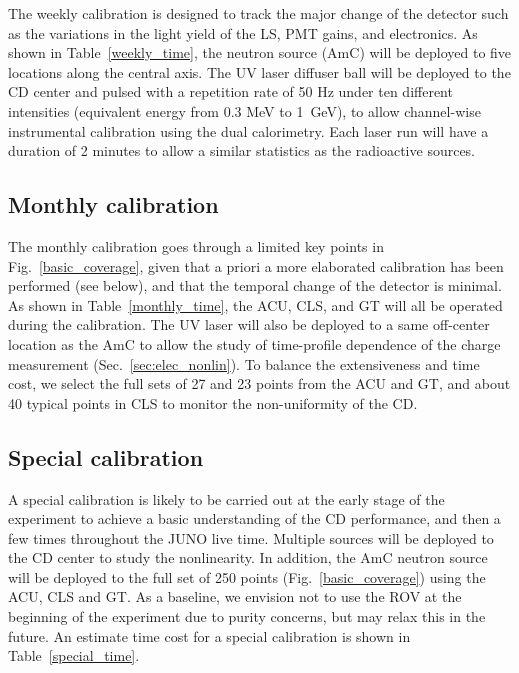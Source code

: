 \documentclass[a4paper,10pt,twoside]{cpc-hepnp}
\begin{document}
\begin{CJK*}{GB}{gbsn}
\begin{multicols}{2}
The weekly calibration is designed to track the major change of the
detector such as the variations in the light yield of the LS, PMT
gains, and electronics. As shown in Table~\ref{weekly_time}, the
neutron source (AmC) will be deployed to five locations along the
central axis. The UV laser diffuser ball will be deployed to the CD
center and pulsed with a repetition rate of 50 Hz under ten different
intensities (equivalent energy from 0.3 MeV to 1~GeV), to allow
channel-wise instrumental calibration using the dual calorimetry. Each
laser run will have a duration of 2 minutes to allow a similar statistics as
the radioactive sources.

\subsection{Monthly calibration} 
The monthly calibration goes through a limited key points in
Fig.~\ref{basic_coverage}, given that a priori a more elaborated
calibration has been performed (see below), and that the temporal
change of the detector is minimal. As shown in
Table~\ref{monthly_time}, the ACU, CLS, and GT will all be operated
during the calibration. The UV laser will also be deployed to a same
off-center location as the AmC to allow the study of time-profile
dependence of the charge measurement (Sec.~\ref{sec:elec_nonlin}).  To
balance the extensiveness and time cost, we select the full sets of 27
and 23 points from the ACU and GT, and about 40 typical points in CLS
to monitor the non-uniformity of the CD.

\subsection{Special calibration}

A special calibration is likely to be carried out at the early stage
of the experiment to achieve a basic understanding of the CD
performance, and then a few times throughout the JUNO live
time. Multiple sources will be deployed to the CD center to study the
nonlinearity. In addition, the AmC neutron source will be deployed to
the full set of 250 points (Fig.~\ref{basic_coverage}) using the ACU,
CLS and GT.  As a baseline, we envision not to use the ROV at the
beginning of the experiment due to purity concerns, but may relax this
in the future. An estimate time cost for a special calibration is
shown in Table~\ref{special_time}.



\end{multicols}
\end{CJK*}
\end{document}
